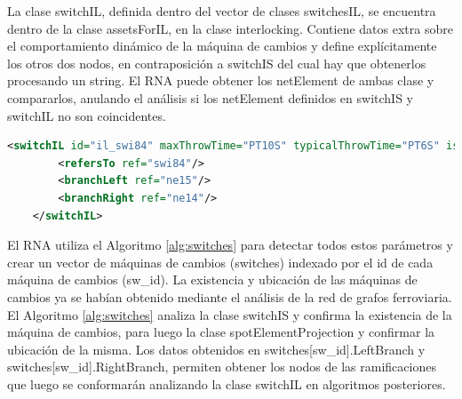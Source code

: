     La clase switchIL, definida dentro del vector de clases switchesIL, se encuentra dentro de la clase assetsForIL, en la clase interlocking. Contiene datos extra sobre el comportamiento dinámico de la máquina de cambios y define explícitamente los otros dos nodos, en contraposición a switchIS del cual hay que obtenerlos procesando un string. El RNA puede obtener los netElement de ambas clase y compararlos, anulando el análisis si los netElement definidos en switchIS y switchIL no son coincidentes.
    
    \begin{lstlisting}[language = XML, caption = Clase switchIL , label = {lst:switchIL}]
    <switchIL id="il_swi84" maxThrowTime="PT10S" typicalThrowTime="PT6S" isKeyLocked="false" returnsToPreferredPosition="false">
        <refersTo ref="swi84"/>
        <branchLeft ref="ne15"/>
        <branchRight ref="ne14"/>
    </switchIL>
    \end{lstlisting}
    
    El RNA utiliza el Algoritmo \ref{alg:switches} para detectar todos estos parámetros y crear un vector de máquinas de cambios (switches) indexado por el id de cada máquina de cambios (sw\_id). La existencia y ubicación de las máquinas de cambios ya se habían obtenido mediante el análisis de la red de grafos ferroviaria. El Algoritmo \ref{alg:switches} analiza la clase switchIS y confirma la existencia de la máquina de cambios, para luego la clase spotElementProjection y confirmar la ubicación de la misma. Los datos obtenidos en switches[sw\_id].LeftBranch y switches[sw\_id].RightBranch, permiten obtener los nodos de las ramificaciones que luego se conformarán analizando la clase switchIL en algoritmos posteriores.

